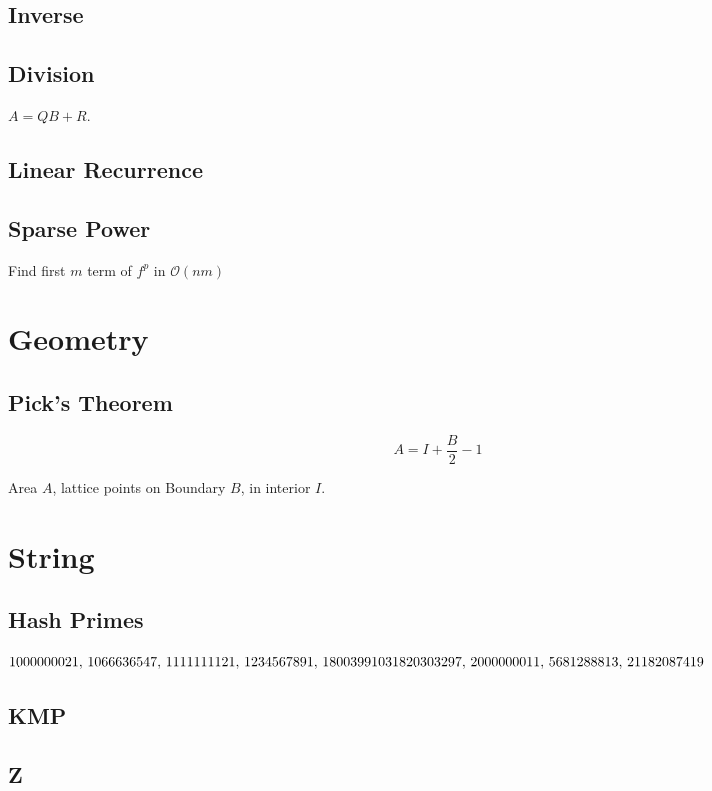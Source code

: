 \documentclass[10pt,a4paper,twocolumn,oneside]{article}
\begin{document}
		\subsection{Inverse}
			
			
		\subsection{Division}
			\(A = QB + R\).
			
			
		\subsection{Linear Recurrence}
			

		\subsection{Sparse Power}
			Find first $m$ term of $f^p$ in $\mathcal O(nm)$
			

	\section{Geometry}
		\subsection{Pick's Theorem}
			\[A = I + \frac B 2 - 1\]

			Area $A$, lattice points on Boundary $B$, in interior $I$.

	\section{String}	
		\subsection{Hash Primes}
			$1000000021,\,1066636547,\,1111111121,\,1234567891,\,1800399103\\1820303297,\,2000000011,\,5681288813,\,21182087419$
		\subsection{KMP}
			
		\subsection{Z}
			
\end{document}
